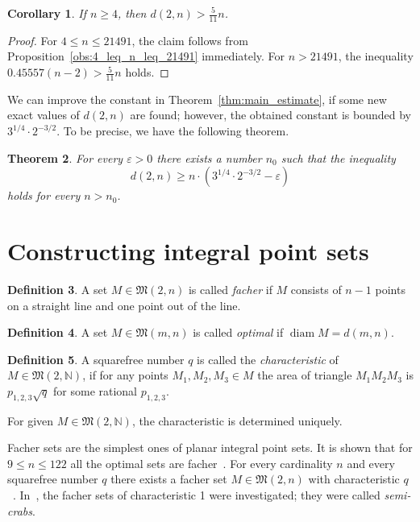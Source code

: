 \documentclass[a4paper,14pt]{article} %
\theoremstyle{plain}
\newtheorem{theorem}{Theorem}[section]
\newtheorem{corollary}[theorem]{Corollary}
\theoremstyle{definition}
\newtheorem{definition}[theorem]{Definition}
\begin{document}
\begin{corollary}
	If $n\geq 4$, then $d(2,n) > \frac{5}{11} n$.
\end{corollary}

\begin{proof}
	For $4 \leq n \leq 21491$, the claim follows from Proposition~\ref{obs:4_leq_n_leq_21491} immediately.
	For $n > 21491$, the inequality $0.45557(n-2) > \frac{5}{11}n$ holds.
\end{proof}


We can improve the constant in Theorem~\ref{thm:main_estimate},
if some new exact values of $d(2,n)$ are found;
however, the obtained constant is bounded by $3^{1/4}\cdot2^{-3/2}$.
To be precise, we have the following theorem.

\begin{theorem}
	For every $\varepsilon > 0$ there exists a number $n_0$ such that the inequality
	\begin{equation}
		d(2,n) \geq n\cdot(3^{1/4}\cdot2^{-3/2} - \varepsilon)
	\end{equation}
	holds for every $n>n_0$.
\end{theorem}



\section{Constructing integral point sets}

\begin{definition}
	A set $M\in\mathfrak{M}(2,n)$ is called \textit{facher}
	if $M$ consists of $n-1$ points on a straight line
	and one point out of the line.
\end{definition}

\begin{definition}
	A set $M\in\mathfrak{M}(m,n)$ is called \textit{optimal}
	if $\operatorname{diam}M=d(m,n)$.
\end{definition}

\begin{definition}
	\cite{kurz2005characteristic}
	A squarefree number $q$ is called the \textit{characteristic} of $M\in\mathfrak{M}(2,\mathbb{N})$,
	if for any points $M_1, M_2, M_3 \in M$ the area of triangle $M_1 M_2 M_3$
	is $p_{1,2,3}\sqrt{q}$ for some rational $p_{1,2,3}$.
\end{definition}
For given $M\in\mathfrak{M}(2,\mathbb{N})$, the characteristic is determined uniquely.

Facher sets are the simplest ones of planar integral point sets.
It is shown that for $9\leq n \leq 122$ all the optimal sets are facher~\cite{kurz2008minimum}.
For every cardinality $n$ and every squarefree number $q$
there exists a facher set $M\in\mathfrak{M}(2,n)$ with characteristic $q$~\cite[Theorem 5]{our-vmmsh-2018}.
In~\cite{antonov2008maximal}, the facher sets of characteristic 1 were investigated; they were called \textit{semi-crabs}.
\end{document}
